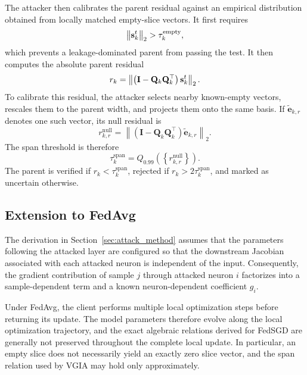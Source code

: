The attacker then calibrates the parent residual against an empirical
distribution obtained from locally matched empty-slice vectors. It first requires
\begin{equation}
\left\|\mathbf{s}_k^t\right\|_2
>
\tau_k^{\mathrm{empty}},
\end{equation}
which prevents a leakage-dominated parent from passing the test. It then
computes the absolute parent residual
\begin{equation}
r_k
=
\left\|
\left(
\mathbf{I}
-
\mathbf{Q}_k\mathbf{Q}_k^{\top}
\right)
\mathbf{s}_k^t
\right\|_2.
\end{equation}
To calibrate this residual, the attacker selects nearby known-empty vectors,
rescales them to the parent width, and projects them onto the same basis.
If $\widetilde{\mathbf e}_{k,r}$ denotes one such vector, its null residual is
\begin{equation}
r_{k,r}^{\mathrm{null}}
=
\left\|
\left(
\mathbf{I}
-
\mathbf{Q}_k\mathbf{Q}_k^{\top}
\right)
\widetilde{\mathbf e}_{k,r}
\right\|_2.
\end{equation}
The span threshold is therefore
\begin{equation}
\tau_k^{\mathrm{span}}
=
Q_{0.99}
\left(
\left\{
r_{k,r}^{\mathrm{null}}
\right\}
\right).
\end{equation}
The parent is verified if
$r_k<\tau_k^{\mathrm{span}}$,
rejected if
$r_k>2\tau_k^{\mathrm{span}}$,
and marked as uncertain otherwise. 


\subsection{Extension to FedAvg}\label{sec:fedavg_vgia}

The derivation in Section~\ref{sec:attack_method} assumes that the
parameters following the attacked layer are configured so that the
downstream Jacobian associated with each attacked neuron is independent of
the input. Consequently, the gradient contribution of sample $j$ through
attacked neuron $i$ factorizes into a sample-dependent term and a known
neuron-dependent coefficient $g_i$.

Under FedAvg, the client performs multiple local optimization steps before
returning its update. The model parameters therefore evolve along the local
optimization trajectory, and the exact algebraic relations derived for
FedSGD are generally not preserved throughout the complete local update.
In particular, an empty slice does not necessarily yield an exactly zero
slice vector, and the span relation used by VGIA may hold only
approximately.

